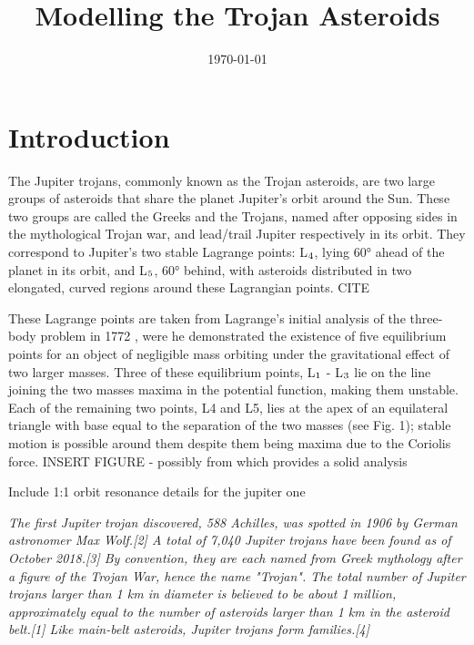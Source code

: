\documentclass[11pt, a4paper,twocolumn]{article} %
\title{Modelling the Trojan Asteroids}
\author{\authorstyle{Christopher Gallagher} 
	\institution{University of Cambridge}}
\date{\today} %
\newcommand*{\subscript}[1]{\ensuremath{_\textrm{{\scriptsize #1}}}}
\begin{document}
\maketitle %

\thispagestyle{firstpage} %




\section{Introduction}
The Jupiter trojans, commonly known as the Trojan asteroids, are two large groups of asteroids that share the planet Jupiter's orbit around the Sun. These two groups are called the Greeks and the Trojans, named after opposing sides in the mythological Trojan war, and lead/trail Jupiter respectively in its orbit. They correspond to Jupiter's two stable Lagrange points: L\subscript{4}, lying 60° ahead of the planet in its orbit, and L\subscript{5}, 60° behind, with asteroids distributed in two elongated, curved regions around these Lagrangian points. CITE

These Lagrange points are taken from Lagrange's initial analysis of the three-body problem in 1772 \cite{Lagrange1772}, were he demonstrated the existence of five equilibrium points for an object of negligible mass orbiting under the gravitational effect of two larger masses. Three of these equilibrium points, L\subscript{1} - L\subscript{3} lie on the line joining the two masses maxima in the potential function, making them unstable. Each of the remaining two points, L4 and L5, lies at the apex of an equilateral triangle with base equal to the separation of the two masses (see Fig. 1); stable motion is possible around them despite them being maxima due to the Coriolis force.  INSERT FIGURE - possibly from \cite{Marzari2002} which provides a solid analysis

Include 1:1 orbit resonance details for the jupiter one



\textit{
The first Jupiter trojan discovered, 588 Achilles, was spotted in 1906 by German astronomer Max Wolf.[2] A total of 7,040 Jupiter trojans have been found as of October 2018.[3] By convention, they are each named from Greek mythology after a figure of the Trojan War, hence the name "Trojan". The total number of Jupiter trojans larger than 1 km in diameter is believed to be about 1 million, approximately equal to the number of asteroids larger than 1 km in the asteroid belt.[1] Like main-belt asteroids, Jupiter trojans form families.[4] }
\end{document}
